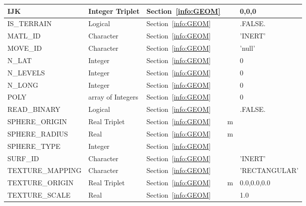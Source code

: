 \documentclass[12pt]{article}
\begin{document}
\begin{longtable}{@{\extracolsep{\fill}}|l|l|l|l|l|}
{\ct IJK}          & Integer Triplet        & Section~\ref{info:GEOM}            &           &   0,0,0                  \\ \hline
{\ct IS\_TERRAIN} & Logical          & Section~\ref{info:GEOM}            &          &    {\ct .FALSE.}         \\ \hline
{\ct MATL\_ID}     & Character              & Section~\ref{info:GEOM}            &           &  {\ct 'INERT'}           \\ \hline
{\ct MOVE\_ID}     & Character              & Section~\ref{info:GEOM}            &           &  {\ct 'null'}           \\ \hline
{\ct N\_LAT}       & Integer                & Section~\ref{info:GEOM}            &           &   0                      \\ \hline
{\ct N\_LEVELS}    & Integer                & Section~\ref{info:GEOM}            &           &   0                      \\ \hline
{\ct N\_LONG}      & Integer                & Section~\ref{info:GEOM}            &           &   0                      \\ \hline
{\ct POLY}        & array of Integers     & Section~\ref{info:GEOM}     &           &    0                     \\ \hline
{\ct READ\_BINARY}   & Logical         & Section~\ref{info:GEOM}            &              &   {\ct .FALSE.} \\ \hline
{\ct SPHERE\_ORIGIN}& Real Triplet          & Section~\ref{info:GEOM}            &   m       &             \\ \hline
{\ct SPHERE\_RADIUS}& Real                  & Section~\ref{info:GEOM}            &   m       &                    \\ \hline
{\ct SPHERE\_TYPE} & Integer                & Section~\ref{info:GEOM}            &           &                        \\ \hline
{\ct SURF\_ID}     & Character              & Section~\ref{info:GEOM}            &           &  {\ct 'INERT'}           \\ \hline
{\ct TEXTURE\_MAPPING}& Character           & Section~\ref{info:GEOM}            &           & {\ct 'RECTANGULAR'}      \\ \hline
{\ct TEXTURE\_ORIGIN} & Real Triplet        & Section~\ref{info:GEOM}            &   m       &   0.0,0.0,0.0            \\ \hline
{\ct TEXTURE\_SCALE}& Real                  & Section~\ref{info:GEOM}            &           &   1.0                    \\ \hline

\end{longtable}
\end{document}
